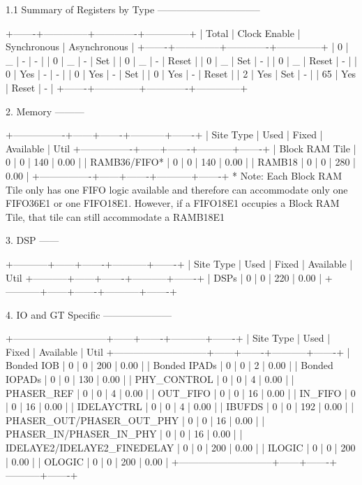 \documentclass{article}
\begin{document}
1.1 Summary of Registers by Type
--------------------------------

+-------+--------------+-------------+--------------+
| Total | Clock Enable | Synchronous | Asynchronous |
+-------+--------------+-------------+--------------+
| 0     |            _ |           - |            - |
| 0     |            _ |           - |          Set |
| 0     |            _ |           - |        Reset |
| 0     |            _ |         Set |            - |
| 0     |            _ |       Reset |            - |
| 0     |          Yes |           - |            - |
| 0     |          Yes |           - |          Set |
| 0     |          Yes |           - |        Reset |
| 2     |          Yes |         Set |            - |
| 65    |          Yes |       Reset |            - |
+-------+--------------+-------------+--------------+


2. Memory
---------

+----------------+------+-------+-----------+-------+
|    Site Type   | Used | Fixed | Available | Util%
+----------------+------+-------+-----------+-------+
| Block RAM Tile |    0 |     0 |       140 |  0.00 |
|   RAMB36/FIFO* |    0 |     0 |       140 |  0.00 |
|   RAMB18       |    0 |     0 |       280 |  0.00 |
+----------------+------+-------+-----------+-------+
* Note: Each Block RAM Tile only has one FIFO logic available and therefore can accommodate only one FIFO36E1 or one FIFO18E1. However, if a FIFO18E1 occupies a Block RAM Tile, that tile can still accommodate a RAMB18E1


3. DSP
------

+-----------+------+-------+-----------+-------+
| Site Type | Used | Fixed | Available | Util%
+-----------+------+-------+-----------+-------+
| DSPs      |    0 |     0 |       220 |  0.00 |
+-----------+------+-------+-----------+-------+


4. IO and GT Specific
---------------------

+-----------------------------+------+-------+-----------+-------+
|          Site Type          | Used | Fixed | Available | Util%
+-----------------------------+------+-------+-----------+-------+
| Bonded IOB                  |    0 |     0 |       200 |  0.00 |
| Bonded IPADs                |    0 |     0 |         2 |  0.00 |
| Bonded IOPADs               |    0 |     0 |       130 |  0.00 |
| PHY_CONTROL                 |    0 |     0 |         4 |  0.00 |
| PHASER_REF                  |    0 |     0 |         4 |  0.00 |
| OUT_FIFO                    |    0 |     0 |        16 |  0.00 |
| IN_FIFO                     |    0 |     0 |        16 |  0.00 |
| IDELAYCTRL                  |    0 |     0 |         4 |  0.00 |
| IBUFDS                      |    0 |     0 |       192 |  0.00 |
| PHASER_OUT/PHASER_OUT_PHY   |    0 |     0 |        16 |  0.00 |
| PHASER_IN/PHASER_IN_PHY     |    0 |     0 |        16 |  0.00 |
| IDELAYE2/IDELAYE2_FINEDELAY |    0 |     0 |       200 |  0.00 |
| ILOGIC                      |    0 |     0 |       200 |  0.00 |
| OLOGIC                      |    0 |     0 |       200 |  0.00 |
+-----------------------------+------+-------+-----------+-------+
\end{document}
